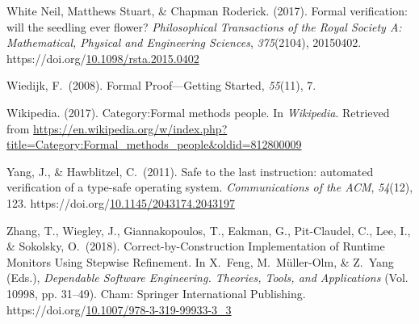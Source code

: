 \documentclass[12pt,twoside]{article}
\begin{document}
{\begin{thebibliography}{222}
White Neil, Matthews Stuart, \& Chapman Roderick. (2017). Formal verification: will the seedling ever flower? \emph{Philosophical Transactions of the Royal Society A: Mathematical, Physical and Engineering Sciences}, \emph{375}(2104), 20150402. https://doi.org/\href{https://dx.doi.org/10.1098/rsta.2015.0402}{10.1098/rsta.2015.0402}\label{white_neil_formal_2017}%

\mdbibitemlabel{[Wiedijk, 2008]}Wiedijk, F.~(2008). Formal Proof—Getting Started, \emph{55}(11), 7.\label{wiedijk_formal_2008}%

\mdbibitemlabel{[Wikipedia, 2017]}Wikipedia. (2017). Category:Formal methods people. In \emph{Wikipedia}. Retrieved from \href{https://en.wikipedia.org/w/index.php?title=Category:Formal_methods_people\%26oldid=812800009}{{\ttfamily https://\hspace{0pt}en.\hspace{0pt}wikipedia.\hspace{0pt}org/\hspace{0pt}w/\hspace{0pt}index.\hspace{0pt}php?\hspace{0pt}title=\hspace{0pt}Category:Formal\_\hspace{0pt}methods\_\hspace{0pt}people\&\hspace{0pt}oldid=\hspace{0pt}812800009}}\label{wikipedia_category:formal_2017}%

Yang, J., \& Hawblitzel, C.~(2011). Safe to the last instruction: automated verification of a type-safe operating system. \emph{Communications of the ACM}, \emph{54}(12), 123. https://doi.org/\href{https://dx.doi.org/10.1145/2043174.2043197}{10.1145/2043174.2043197}\label{yang_safe_2011}%

\mdbibitemlabel{[Zhang et al., 2018]}Zhang, T., Wiegley, J., Giannakopoulos, T., Eakman, G., Pit-Claudel, C., Lee, I., \& Sokolsky, O.~(2018). Correct-by-Construction Implementation of Runtime Monitors Using Stepwise Refinement. In X.~Feng, M.~Müller-Olm, \& Z.~Yang (Eds.), \emph{Dependable Software Engineering. Theories, Tools, and Applications} (Vol. 10998, pp. 31–49). Cham: Springer International Publishing. https://doi.org/\href{https://dx.doi.org/10.1007/978-3-319-99933-3_3}{10.1007/978-3-319-99933-3\_3}\label{feng_correct-by-construction_2018}%


\end{thebibliography}}
\end{document}
